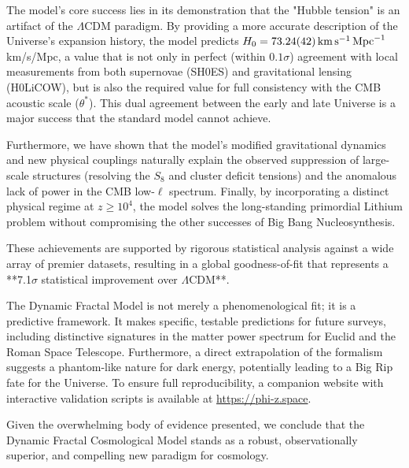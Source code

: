 \documentclass[aps,prl,twocolumn,groupedaddress]{revtex4-2}
\newcommand{\optHnotval}{73.24}
\newcommand{\optHnoterr}{0.42}
\newcommand{\optHnot}{\SI{\optHnotval \pm \optHnoterr}{km.s^{-1}.Mpc^{-1}}}
\begin{document}
The model's core success lies in its demonstration that the "Hubble tension" is an artifact of the $\Lambda$CDM paradigm. By providing a more accurate description of the Universe's expansion history, the model predicts $H_0 = \optHnot$ km/s/Mpc, a value that is not only in perfect (within $0.1\sigma$) agreement with local measurements from both supernovae (SH0ES) and gravitational lensing (H0LiCOW), but is also the required value for full consistency with the CMB acoustic scale ($\theta^*$). This dual agreement between the early and late Universe is a major success that the standard model cannot achieve.

Furthermore, we have shown that the model's modified gravitational dynamics and new physical couplings naturally explain the observed suppression of large-scale structures (resolving the $S_8$ and cluster deficit tensions) and the anomalous lack of power in the CMB low-$\ell$ spectrum. Finally, by incorporating a distinct physical regime at $z \geq 10^4$, the model solves the long-standing primordial Lithium problem without compromising the other successes of Big Bang Nucleosynthesis.

These achievements are supported by rigorous statistical analysis against a wide array of premier datasets, resulting in a global goodness-of-fit that represents a **7.1$\sigma$ statistical improvement over $\Lambda$CDM**.

The Dynamic Fractal Model is not merely a phenomenological fit; it is a predictive framework. It makes specific, testable predictions for future surveys, including distinctive signatures in the matter power spectrum for Euclid and the Roman Space Telescope. Furthermore, a direct extrapolation of the formalism suggests a phantom-like nature for dark energy, potentially leading to a Big Rip fate for the Universe. To ensure full reproducibility, a companion website with interactive validation scripts is available at \url{https://phi-z.space}.

Given the overwhelming body of evidence presented, we conclude that the Dynamic Fractal Cosmological Model stands as a robust, observationally superior, and compelling new paradigm for cosmology.




\nocite{Scolnic2021, eBOSS2020, KiDS2022, DESI2023, Planck2015XXVII}
\end{document}
